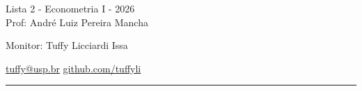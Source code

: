 \documentclass[12pt,letterpaper, onecolumn]{exam}
\begin{document}
\begingroup  
    \centering
    \LARGE Lista 2 - Econometria I - 2026\\[0.5em]
    \large Prof: André Luiz Pereira Mancha \par
    \large Monitor: Tuffy Licciardi Issa  \par
   \small \href{mailto:tuffy@usp.br}{tuffy@usp.br} \quad
\href{https://github.com/Tuffyli}{github.com/tuffyli} \par
\endgroup
\rule{\textwidth}{0.4pt}
\pointsdroppedatright   %
\printanswers
\renewcommand{\solutiontitle}{\noindent\textbf{Ans:}\enspace}   %
\end{document}
